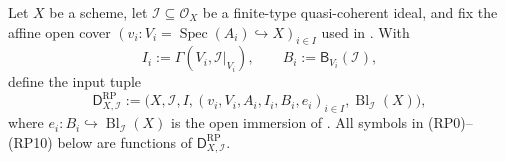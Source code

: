\begin{definition}
  \label{def:nagata-global-blowup-relative-proj-comparison}

  Let $X$ be a scheme, let
  $\mathcal I\subseteq\mathcal O_X$ be a finite-type quasi-coherent ideal,
  and fix the affine open cover
  $(v_i\colon V_i=\operatorname{Spec}(A_i)\hookrightarrow X)_{i\in I}$
  used in .  With
  \[
    I_i:=\Gamma(V_i,\mathcal I|_{V_i}),\qquad
    B_i:=\mathsf B_{V_i}(\mathcal I),
  \]
  define the input tuple
  \[
    \mathsf D^{\mathrm{RP}}_{X,\mathcal I}:=
      \bigl(X,\mathcal I,I,(v_i,V_i,A_i,I_i,B_i,e_i)_{i\in I},
        \operatorname{Bl}_{\mathcal I}(X)\bigr),                 \tag{RP-1}
  \]
  where
  $e_i\colon B_i\hookrightarrow\operatorname{Bl}_{\mathcal I}(X)$ is the
  open immersion of .  All symbols in
  (RP0)--(RP10) below are functions of
  $\mathsf D^{\mathrm{RP}}_{X,\mathcal I}$.


\end{definition}
